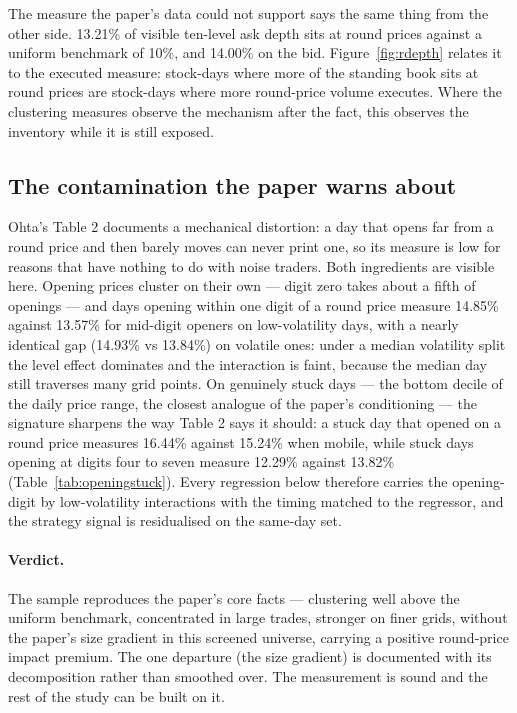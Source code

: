 The measure the paper's data could not support says the same thing from the other
side. 13.21\% of visible ten-level ask depth sits at round prices against a
uniform benchmark of 10\%, and
14.00\% on the bid.
Figure~\ref{fig:rdepth} relates it to the executed measure: stock-days where
more of the standing book sits at round prices are stock-days where more
round-price volume executes. Where the clustering measures observe the mechanism
after the fact, this observes the inventory while it is still exposed.

\subsection{The contamination the paper warns about}




Ohta's Table 2 documents a mechanical distortion: a day that opens far from a round price and then barely moves can never print one, so its measure is low for reasons that have nothing to do with noise traders. Both ingredients are visible here. Opening prices cluster on their own --- digit zero takes about a fifth of openings --- and days opening within one digit of a round price measure 14.85\% against 13.57\% for mid-digit openers on low-volatility days, with a nearly identical gap (14.93\% vs 13.84\%) on volatile ones: under a median volatility split the level effect dominates and the interaction is faint, because the median day still traverses many grid points. On genuinely stuck days --- the bottom decile of the daily price range, the closest analogue of the paper's conditioning --- the signature sharpens the way Table 2 says it should: a stuck day that opened on a round price measures 16.44\% against 15.24\% when mobile, while stuck days opening at digits four to seven measure 12.29\% against 13.82\% (Table~\ref{tab:openingstuck}). Every regression below therefore carries the opening-digit by low-volatility interactions with the timing matched to the regressor, and the strategy signal is residualised on the same-day set.

\paragraph{Verdict.}
The sample reproduces the paper's core facts --- clustering well above the uniform benchmark, concentrated in large trades, stronger on finer grids, without the paper's size gradient in this screened universe, carrying a positive round-price impact premium. The one departure (the size gradient) is documented with its decomposition rather than smoothed over. The measurement is sound and the rest of the study can be built on it.

